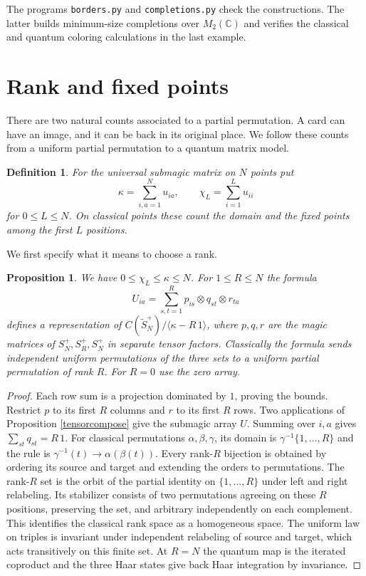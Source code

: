 \documentclass[11pt,a4paper]{article}
\newtheorem{prop}[thm]{Proposition}
\newtheorem{defn}[thm]{Definition}
\begin{document}
The programs \texttt{borders.py} and \texttt{completions.py} check the constructions. The latter builds minimum-size completions over $M_2(\mathbb C)$ and verifies the classical and quantum coloring calculations in the last example.

\section{Rank and fixed points}\label{ranksection}

There are two natural counts associated to a partial permutation. A card can have an image, and it can be back in its original place. We follow these counts from a uniform partial permutation to a quantum matrix model.

\begin{defn}
For the universal submagic matrix on $N$ points put
\[
 \kappa=\sum_{i,a=1}^N u_{ia},\qquad \chi_L=\sum_{i=1}^L u_{ii}
\]
for $0\leq L\leq N$. On classical points these count the domain and the fixed points among the first $L$ positions.
\end{defn}

We first specify what it means to choose a rank.

\begin{samepage}
\begin{prop}\label{rankmodel}
We have $0\leq\chi_L\leq\kappa\leq N$. For $1\leq R\leq N$ the formula
\[
 U_{ia}=\sum_{s,t=1}^R p_{is}\otimes q_{st}\otimes r_{ta}
\]
defines a representation of $C(\widetilde S_N^+)/\langle\kappa-R\,1\rangle$, where $p,q,r$ are the magic matrices of $S_N^+,S_R^+,S_N^+$ in separate tensor factors. Classically the formula sends independent uniform permutations of the three sets to a uniform partial permutation of rank $R$. For $R=0$ use the zero array.
\end{prop}
\end{samepage}
\begin{proof}
Each row sum is a projection dominated by $1$, proving the bounds. Restrict $p$ to its first $R$ columns and $r$ to its first $R$ rows. Two applications of Proposition \ref{tensorcompose} give the submagic array $U$. Summing over $i,a$ gives $\sum_{st}q_{st}=R\,1$. For classical permutations $\alpha,\beta,\gamma$, its domain is $\gamma^{-1}\{1,\ldots,R\}$ and the rule is $\gamma^{-1}(t)\to\alpha(\beta(t))$. Every rank-$R$ bijection is obtained by ordering its source and target and extending the orders to permutations. The rank-$R$ set is the orbit of the partial identity on $\{1,\ldots,R\}$ under left and right relabeling. Its stabilizer consists of two permutations agreeing on these $R$ positions, preserving the set, and arbitrary independently on each complement. This identifies the classical rank space as a homogeneous space. The uniform law on triples is invariant under independent relabeling of source and target, which acts transitively on this finite set. At $R=N$ the quantum map is the iterated coproduct and the three Haar states give back Haar integration by invariance.
\end{proof}
\end{document}
